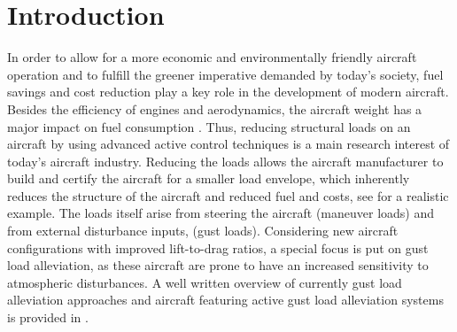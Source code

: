 \documentclass[graybox]{svmult}
\begin{document}
\section{Introduction}

In order to allow for a more economic and environmentally friendly aircraft operation and to fulfill the greener imperative demanded by today's society, fuel savings and cost reduction play a key role in the development of modern aircraft. Besides the efficiency of engines and aerodynamics, the aircraft weight has a major impact on fuel consumption \cite{IEA2009}. 
Thus, reducing structural loads on an aircraft by using advanced active control techniques is a main research interest of today's aircraft industry. Reducing the loads allows the aircraft manufacturer to build and certify \cite{FAA15} the aircraft for a smaller load envelope, which inherently reduces the structure of the aircraft and reduced fuel and costs, see \cite{Johnston79} for a realistic example. The loads itself arise from steering the aircraft (maneuver loads) and from external disturbance inputs, (gust loads). Considering new aircraft configurations with improved lift-to-drag ratios, a special focus is put on gust load alleviation, as these aircraft are prone to have an increased sensitivity to atmospheric disturbances. A well written overview of currently gust load alleviation approaches and aircraft featuring  active gust load alleviation systems is provided in \cite{Regan12}.

\end{document}
